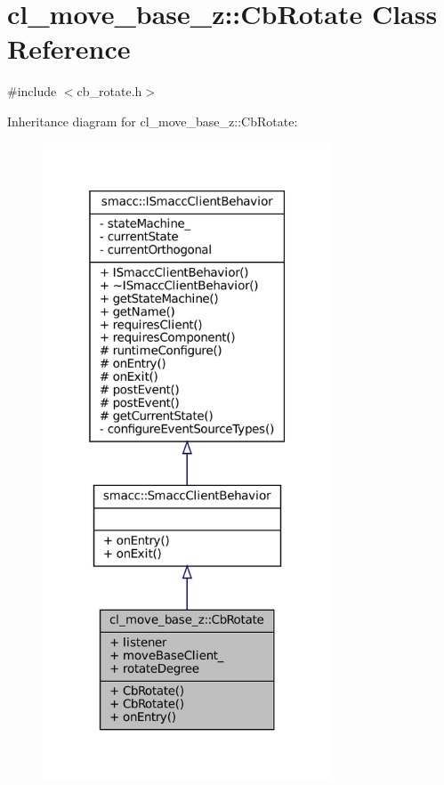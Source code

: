 \hypertarget{classcl__move__base__z_1_1CbRotate}{}\section{cl\+\_\+move\+\_\+base\+\_\+z\+:\+:Cb\+Rotate Class Reference}
\label{classcl__move__base__z_1_1CbRotate}


{\ttfamily \#include $<$cb\+\_\+rotate.\+h$>$}



Inheritance diagram for cl\+\_\+move\+\_\+base\+\_\+z\+:\+:Cb\+Rotate\+:
\nopagebreak
\begin{figure}[H]
\begin{center}
\leavevmode
\includegraphics[width=244pt]{classcl__move__base__z_1_1CbRotate__inherit__graph}
\end{center}
\end{figure}


